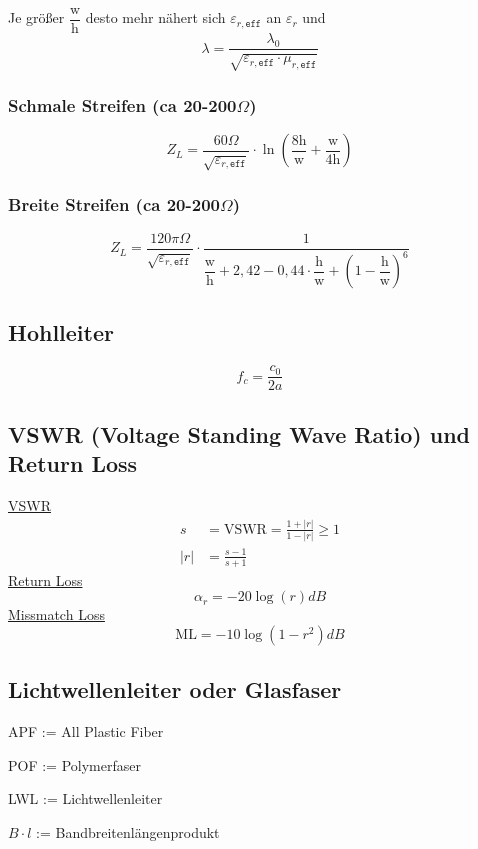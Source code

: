 Je größer $\dfrac{\mathrm{w}}{\mathrm{h}}$ desto mehr nähert sich $\varepsilon_{r,\texttt{eff}}$ an $\varepsilon_r$ und 
\[
    \lambda = \frac{\lambda_0}{\sqrt{\varepsilon_{r,\texttt{eff}}\cdot\mu_{r,\texttt{eff}}}}
\]

\subsubsection[Schmale Streifen]{Schmale Streifen (ca 20-200$\Omega$)}
\[
    Z_L = \frac{60\Omega}{\sqrt{\varepsilon_{r,\texttt{eff}}}}\cdot\ln\left(\frac{8\mathrm{h}}{\mathrm{w}}+\frac{\mathrm{w}}{4\mathrm{h}}\right)
\]
\subsubsection[Breite Streifen]{Breite Streifen (ca 20-200$\Omega$)}
\[
    Z_L = \frac{120\pi\Omega}{\sqrt{\varepsilon_{r,\texttt{eff}}}}\cdot\frac{1}{\dfrac{\mathrm{w}}{\mathrm{h}}+2,42-0,44\cdot\dfrac{\mathrm{h}}{\mathrm{w}}+\left(1-\dfrac{\mathrm{h}}{\mathrm{w}}\right)^6}
\]

\subsection{Hohlleiter}
\[
    f_c = \frac{c_0}{2a}
\]

\subsection{VSWR (Voltage Standing Wave Ratio) und Return Loss}\label{sec:VSWR}
\underline{VSWR}
\begin{align*}
    s   & = \mathrm{VSWR} = \frac{1+|r|}{1-|r|}\geq 1 \\
    |r| & = \frac{s-1}{s+1}
\end{align*}
\underline{Return Loss}
\[
    \alpha_r = -20\log(r)dB
\]
\underline{Missmatch Loss}
\[
    \mathrm{ML} = -10\log(1-r^2)dB
\]
\subsection{Lichtwellenleiter oder Glasfaser}

\begin{description}
    \setlength\itemsep{1pt}
    \item APF := All Plastic Fiber
    \item POF := Polymerfaser
    \item LWL := Lichtwellenleiter
    \item $B\cdot l$ := Bandbreitenlängenprodukt
\end{description}

